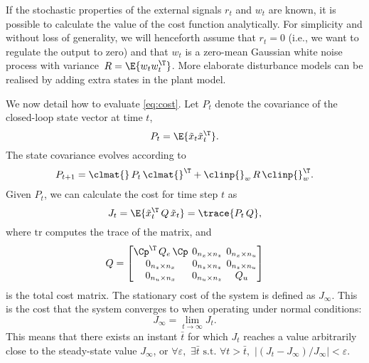 If the stochastic properties of the external signals $r_t$ and $w_t$ are known, it is possible to calculate the value of the cost function analytically.
For simplicity and without loss of generality, we will henceforth assume that $r_t = 0$ (i.e., we want to regulate the output to zero) and that $w_t$ is a zero-mean Gaussian white noise process with variance~$R=\E{w_t w_t^\T}$.
More elaborate disturbance models can be realised by adding extra states in the plant model.

We now detail how to evaluate \eqref{eq:cost}.
Let $P_t$ denote the covariance of the closed-loop state vector at time $t$,
%
\begin{equation}
\label{eq:covarcalc}
    P_t = \E{\tilde x_t \tilde x_t^\T }.
\end{equation}
%
The state covariance evolves according to
%
\begin{equation}
\label{eq:covevolution}
    P_{t+1} = \clmat{} \,P_t\, \clmat{}^\T + \clinp{}_w \,R\, \clinp{}_w^\T.
\end{equation}
%
Given $P_t$, we can calculate the cost for time step $t$ as
%
\begin{equation}
\label{eq:covartocost}
    J_t = \E{\tilde x_t^\T \,Q\, \tilde x_t } = \trace{P_t \,Q},
\end{equation}
%
where $\mathrm{tr}$ computes the trace of the matrix, and
%
\begin{equation}
    \setlength\arraycolsep{2pt}
    Q = \begin{bmatrix} 
        \Cp^\T\,Q_e\,\Cp                           & 0_{n_x \times n_z} & 0_{n_x \times n_u} \\
        0_{n_z \times n_x}  & 0_{n_z \times n_z}   & 0_{n_z \times n_u} \\
        0_{n_u \times n_x} & 0_{n_u \times n_z}  & Q_u
    \end{bmatrix} 
\end{equation}
%
is the total cost matrix.
The stationary cost of the system is defined as $J_\infty$.
This is the cost that the system converges to when operating under normal conditions:
%
\begin{equation}
    J_\infty = \lim_{t\rightarrow\infty} J_t.
\end{equation}
%
This means that there exists an instant $\bar{t}$ for which $J_t$ reaches a value arbitrarily close to the steady-state value $J_\infty$, or $\forall \varepsilon, \,\, \exists \bar{t} \text{~s.t.~} \forall t>\bar{t},\,\,|(J_t - J_\infty)/J_\infty| < \varepsilon$.
